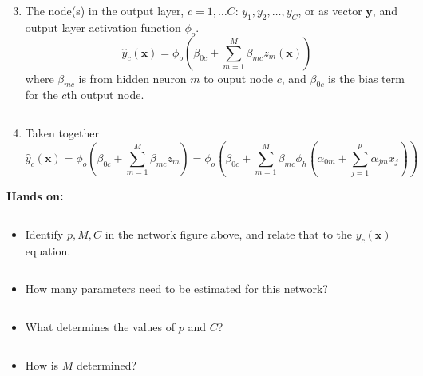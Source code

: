 \documentclass[10pt,ignorenonframetext,]{beamer}
\providecommand{\tightlist}{%
  \setlength{\itemsep}{0pt}\setlength{\parskip}{0pt}}
\begin{document}
\begin{frame}

\begin{enumerate}
\setcounter{enumi}{2}
\tightlist
\item
  The node(s) in the output layer, \(c=1,\ldots C\):
  \(y_1, y_2, \ldots, y_C\), or as vector \({\boldsymbol y}\), and
  output layer activation function \(\phi_o\). \[
  \hat{y}_c({\boldsymbol x})=\phi_o(\beta_{0c}+\sum_{m=1}^M \beta_{mc}z_{m}({\boldsymbol x}))
  \] where \(\beta_{mc}\) is from hidden neuron \(m\) to ouput node
  \(c\), and \(\beta_{0c}\) is the bias term for the \(c\)th output
  node.
\end{enumerate}

\(~\)

\begin{enumerate}
\setcounter{enumi}{3}
\tightlist
\item
  Taken together \[
  \hat{y}_c({\boldsymbol x})=\phi_o(\beta_{0c}+\sum_{m=1}^M \beta_{mc}z_{m})=\phi_o(\beta_{0c}+\sum_{m=1}^M \beta_{mc}\phi_h(\alpha_{0m}+\sum_{j=1}^p \alpha_{jm}x_{j}))
  \]
\end{enumerate}

\end{frame}

\begin{frame}

\textbf{Hands on:}

\(~\)

\begin{itemize}
\tightlist
\item
  Identify \(p, M, C\) in the network figure above, and relate that to
  the \(y_{c}({\boldsymbol x})\) equation.
\end{itemize}

\(~\)

\begin{itemize}
\tightlist
\item
  How many parameters need to be estimated for this network?
\end{itemize}

\(~\)

\begin{itemize}
\tightlist
\item
  What determines the values of \(p\) and \(C\)?
\end{itemize}

\(~\)

\begin{itemize}
\tightlist
\item
  How is \(M\) determined?
\end{itemize}

\end{frame}
\end{document}
